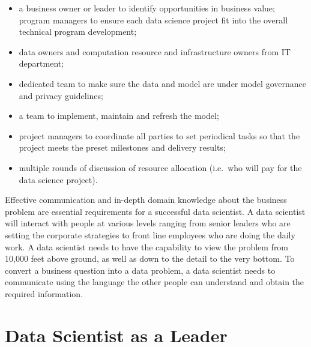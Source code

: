 \documentclass[]{book}
\providecommand{\tightlist}{%
  \setlength{\itemsep}{0pt}\setlength{\parskip}{0pt}}
\theoremstyle{definition}
\theoremstyle{definition}
\theoremstyle{remark}
\begin{document}
\begin{itemize}
\tightlist
\item
  a business owner or leader to identify opportunities in business
  value; program managers to ensure each data science project fit into
  the overall technical program development;
\item
  data owners and computation resource and infrastructure owners from IT
  department;
\item
  dedicated team to make sure the data and model are under model
  governance and privacy guidelines;
\item
  a team to implement, maintain and refresh the model;
\item
  project managers to coordinate all parties to set periodical tasks so
  that the project meets the preset milestones and delivery results;
\item
  multiple rounds of discussion of resource allocation (i.e.~who will
  pay for the data science project).
\end{itemize}

Effective communication and in-depth domain knowledge about the business
problem are essential requirements for a successful data scientist. A
data scientist will interact with people at various levels ranging from
senior leaders who are setting the corporate strategies to front line
employees who are doing the daily work. A data scientist needs to have
the capability to view the problem from 10,000 feet above ground, as
well as down to the detail to the very bottom. To convert a business
question into a data problem, a data scientist needs to communicate
using the language the other people can understand and obtain the
required information.

\section{Data Scientist as a Leader}\label{data-scientist-as-a-leader}
\end{document}
